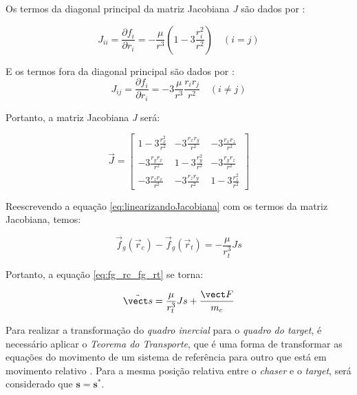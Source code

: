 Os termos da diagonal principal da matriz Jacobiana \emph{J} são dados por \cite{fehse2003}:

\begin{equation}
\label{eq:jacobianaDiagonal}
J_{ii} = \frac{\partial f_i}{\partial r_i} = -\frac{\mu}{r^3} \left(1 - 3\frac{r_i^2}{r^2}\right) \quad (i = j)
\end{equation}

E os termos fora da diagonal principal são dados por \cite{fehse2003}:
\begin{equation}
\label{eq:jacobianaForaDiagonal}
J_{ij} = \frac{\partial f_i}{\partial r_i} = -3 \frac{\mu}{r^3} \frac{r_i r_j}{r^2} \quad (i \neq j)
\end{equation}

Portanto, a matriz Jacobiana \emph{J} será:

\begin{equation}
    \label{eq:jacobianaGenerica}
\vec J = 
\begin{bmatrix}
1 - 3\frac{r_x^2}{r^2} &  -3\frac{r_x r_y}{r^2} &  -3\frac{r_x r_z}{r^2} \\
-3\frac{r_y r_x}{r^2} & 1 - 3\frac{r_y^2}{r^2} & -3\frac{r_y r_z}{r^2} \\
-3\frac{r_z r_x}{r^2} & -3\frac{r_z r_y}{r^2} & 1 - 3\frac{r_z^2}{r^2}
\end{bmatrix}
\end{equation}

Reescrevendo a equação \eqref{eq:linearizandoJacobiana} com os termos da matriz Jacobiana, temos:

\begin{equation}
\label{eq:linearizandoJacobiana2}
\vec f_g(\vec r_c) - \vec f_g(\vec r_t) = -\frac{\mu}{r_t^3} Js
\end{equation}

Portanto, a equação \eqref{eq:fg_rc_fg_rt} se torna:

\begin{equation}
\label{eq:fg_rc_fg_rt_linearizada}  
\ddot{\vect s} = \frac{\mu}{r_t^3} Js + \frac{\vect F}{m_c}
\end{equation}

Para realizar a transformação do \emph{quadro inercial} para o \emph{quadro do target}, é necessário aplicar o \emph{Teorema do Transporte}, que é uma forma de transformar as equações do movimento de um sistema de referência para outro que está em movimento relativo \cite{wie2008space, symon1979}. Para a mesma posição relativa entre o \emph{chaser} e o \emph{target}, será considerado que $\mathbf s = \mathbf s^{*}$.

